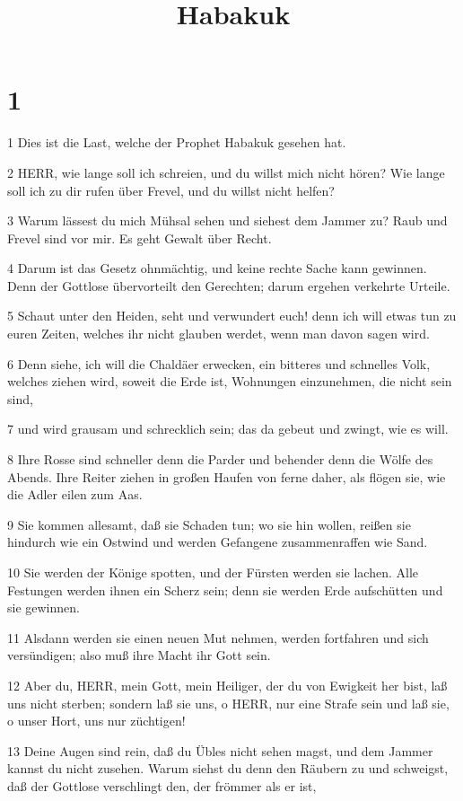 

\title{Habakuk}


\chapter{1}

\par 1 Dies ist die Last, welche der Prophet Habakuk gesehen hat.
\par 2 HERR, wie lange soll ich schreien, und du willst mich nicht hören? Wie lange soll ich zu dir rufen über Frevel, und du willst nicht helfen?
\par 3 Warum lässest du mich Mühsal sehen und siehest dem Jammer zu? Raub und Frevel sind vor mir. Es geht Gewalt über Recht.
\par 4 Darum ist das Gesetz ohnmächtig, und keine rechte Sache kann gewinnen. Denn der Gottlose übervorteilt den Gerechten; darum ergehen verkehrte Urteile.
\par 5 Schaut unter den Heiden, seht und verwundert euch! denn ich will etwas tun zu euren Zeiten, welches ihr nicht glauben werdet, wenn man davon sagen wird.
\par 6 Denn siehe, ich will die Chaldäer erwecken, ein bitteres und schnelles Volk, welches ziehen wird, soweit die Erde ist, Wohnungen einzunehmen, die nicht sein sind,
\par 7 und wird grausam und schrecklich sein; das da gebeut und zwingt, wie es will.
\par 8 Ihre Rosse sind schneller denn die Parder und behender denn die Wölfe des Abends. Ihre Reiter ziehen in großen Haufen von ferne daher, als flögen sie, wie die Adler eilen zum Aas.
\par 9 Sie kommen allesamt, daß sie Schaden tun; wo sie hin wollen, reißen sie hindurch wie ein Ostwind und werden Gefangene zusammenraffen wie Sand.
\par 10 Sie werden der Könige spotten, und der Fürsten werden sie lachen. Alle Festungen werden ihnen ein Scherz sein; denn sie werden Erde aufschütten und sie gewinnen.
\par 11 Alsdann werden sie einen neuen Mut nehmen, werden fortfahren und sich versündigen; also muß ihre Macht ihr Gott sein.
\par 12 Aber du, HERR, mein Gott, mein Heiliger, der du von Ewigkeit her bist, laß uns nicht sterben; sondern laß sie uns, o HERR, nur eine Strafe sein und laß sie, o unser Hort, uns nur züchtigen!
\par 13 Deine Augen sind rein, daß du Übles nicht sehen magst, und dem Jammer kannst du nicht zusehen. Warum siehst du denn den Räubern zu und schweigst, daß der Gottlose verschlingt den, der frömmer als er ist,

